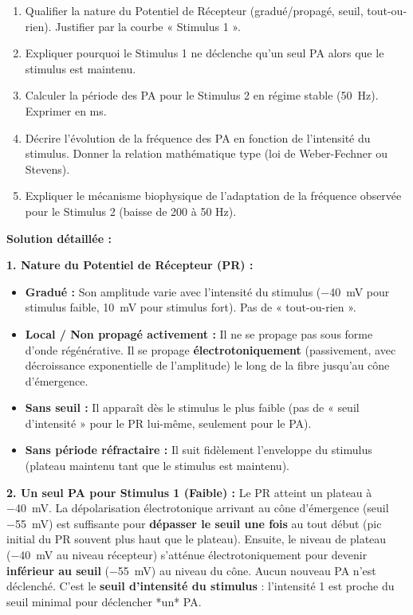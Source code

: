 \documentclass[11pt]{article}
\begin{document}
\begin{exoresolu}
\begin{enumerate}
    \item Qualifier la nature du Potentiel de Récepteur (gradué/propagé, seuil, tout-ou-rien). Justifier par la courbe « Stimulus 1 ».
    \item Expliquer pourquoi le Stimulus 1 ne déclenche qu'un seul PA alors que le stimulus est maintenu.
    \item Calculer la période des PA pour le Stimulus 2 en régime stable (\SI{50}{Hz}). Exprimer en ms.
    \item Décrire l'évolution de la fréquence des PA en fonction de l'intensité du stimulus. Donner la relation mathématique type (loi de Weber-Fechner ou Stevens).
    \item Expliquer le mécanisme biophysique de l'adaptation de la fréquence observée pour le Stimulus 2 (baisse de 200 à 50 Hz).
\end{enumerate}

\tcblower
\textbf{Solution détaillée :}

\textbf{1. Nature du Potentiel de Récepteur (PR) :}
\begin{itemize}
    \item \textbf{Gradué :} Son amplitude varie avec l'intensité du stimulus (\SI{-40}{mV} pour stimulus faible, \SI{+10}{mV} pour stimulus fort). Pas de « tout-ou-rien ».
    \item \textbf{Local / Non propagé activement :} Il ne se propage pas sous forme d'onde régénérative. Il se propage \textbf{électrotoniquement} (passivement, avec décroissance exponentielle de l'amplitude) le long de la fibre jusqu'au cône d'émergence.
    \item \textbf{Sans seuil :} Il apparaît dès le stimulus le plus faible (pas de « seuil d'intensité » pour le PR lui-même, seulement pour le PA).
    \item \textbf{Sans période réfractaire :} Il suit fidèlement l'enveloppe du stimulus (plateau maintenu tant que le stimulus est maintenu).
\end{itemize}

\textbf{2. Un seul PA pour Stimulus 1 (Faible) :}
Le PR atteint un plateau à \SI{-40}{mV}. La dépolarisation électrotonique arrivant au cône d'émergence (seuil \SI{-55}{mV}) est suffisante pour \textbf{dépasser le seuil une fois} au tout début (pic initial du PR souvent plus haut que le plateau). Ensuite, le niveau de plateau (\SI{-40}{mV} au niveau récepteur) s'atténue électrotoniquement pour devenir \textbf{inférieur au seuil} (\SI{-55}{mV}) au niveau du cône. Aucun nouveau PA n'est déclenché. C'est le \textbf{seuil d'intensité du stimulus} : l'intensité 1 est proche du seuil minimal pour déclencher *un* PA.


\end{exoresolu}
\end{document}
